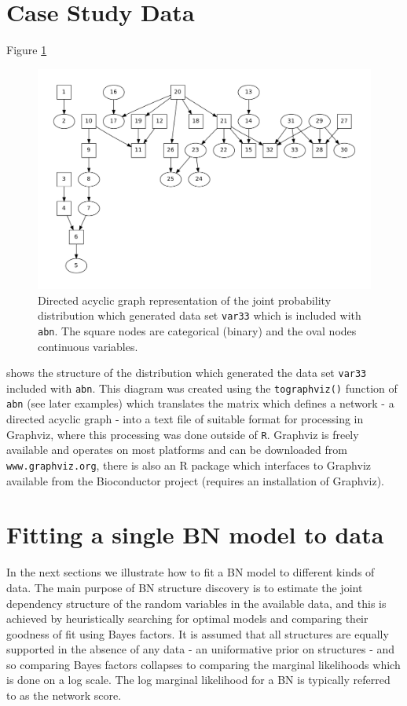 \documentclass[nojss]{jss}
\begin{document}
\section{Case Study Data}
Figure \ref{fig1}
\begin{figure}[htb]
\includegraphics{var33_MASTER}
\vspace{-1.0cm}
\caption{Directed acyclic graph representation of the joint probability distribution which generated data set {\tt var33} which is included with {\tt abn}. The square nodes are categorical (binary) and the oval nodes continuous variables.} \label{fig1}
\end{figure}
shows the structure of the distribution which generated the data set {\tt var33} included with {\tt abn}. This diagram was created using the {\tt tographviz()} function of {\tt abn} (see later examples) which translates the matrix which defines a network - a directed acyclic graph - into a text file of suitable format for processing in Graphviz, where this processing was done outside of {\tt R}. Graphviz is freely available and operates on most platforms and can be downloaded from {\tt www.graphviz.org}, there is also an R package which interfaces to Graphviz available from the Bioconductor project (requires an installation of Graphviz). 

\section{Fitting a single BN model to data}
In the next sections we illustrate how to fit a BN model to different kinds of data. The main purpose of BN structure discovery is to estimate the joint dependency structure of the random variables in the available data, and this is achieved by heuristically searching for optimal models and comparing their goodness of fit using Bayes factors. It is assumed that all structures are equally supported in the absence of any data - an uniformative prior on structures - and so comparing Bayes factors collapses to comparing the marginal likelihoods which is done on a log scale. The log marginal likelihood for a BN is typically referred to as the network score. 
\end{document}
